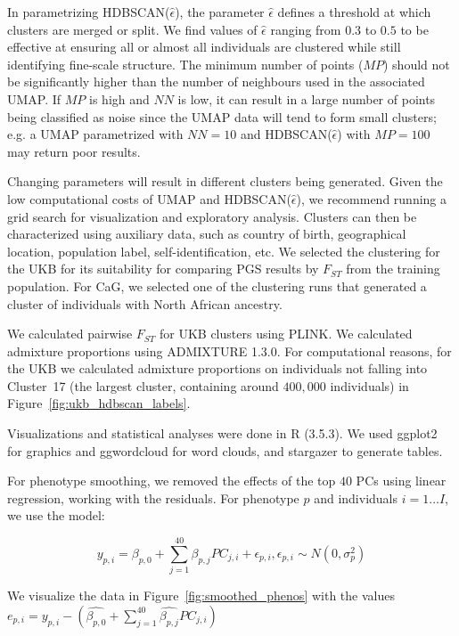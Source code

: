 In parametrizing HDBSCAN($\hat{\epsilon}$), the parameter $\hat{\epsilon}$ defines a threshold at which clusters are merged or split. We find values of $\hat{\epsilon}$ ranging from $0.3$ to $0.5$ to be effective at ensuring all or almost all individuals are clustered while still identifying fine-scale structure. The minimum number of points ($MP$) should not be significantly higher than the number of neighbours used in the associated UMAP. If $MP$ is high and $NN$ is low, it can result in a large number of points being classified as noise since the UMAP data will tend to form small clusters; e.g. a UMAP parametrized with $NN=10$ and HDBSCAN($\hat{\epsilon}$) with $MP=100$ may return poor results.

Changing parameters will result in different clusters being generated. Given the low computational costs of UMAP and HDBSCAN($\hat{\epsilon}$), we recommend running a grid search for visualization and exploratory analysis. Clusters can then be characterized using auxiliary data, such as country of birth, geographical location, population label, self-identification, etc. We selected the clustering for the UKB for its suitability for comparing PGS results by $F_{ST}$ from the training population. For CaG, we selected one of the clustering runs that generated a cluster of individuals with North African ancestry.

We calculated pairwise $F_{ST}$ for UKB clusters using PLINK\citep{purcell_plink_2007}. We calculated admixture proportions using ADMIXTURE 1.3.0\citep{alexander_fast_2009}. For computational reasons, for the UKB we calculated admixture proportions on individuals not falling into Cluster~17 (the largest cluster, containing around $400,000$ individuals) in Figure~\ref{fig:ukb_hdbscan_labels}.

Visualizations and statistical analyses were done in R (3.5.3)\citep{r_2018}. We used ggplot2\citep{wickham_2016} for graphics and ggwordcloud for word clouds, and stargazer\citep{Hlavac2018-fy} to generate tables.

For phenotype smoothing, we removed the effects of the top $40$ PCs using linear regression, working with the residuals. For phenotype $p$ and individuals $i=1 \dots I$, we use the model:

$$ y_{p,i} = \beta_{p,0} + \sum_{j=1}^{40}\beta_{p,j}PC_{j,i} + \epsilon_{p,i},  \epsilon_{p,i} \sim N(0,\sigma^2_{p}) $$

We visualize the data in Figure~\ref{fig:smoothed_phenos} with the values $ e_{p,i} = y_{p,i} - (\hat{\beta_{p,0}} + \sum_{j=1}^{40}\hat{\beta_{p,j}}PC_{j,i}) $



\clearpage

\makeatletter
\renewcommand\thetable{\@arabic\c@chapter s\@arabic\c@table}
\renewcommand \thefigure{\@arabic\c@chapter s\@arabic\c@figure}
\makeatother

\setcounter{figure}{0}  
\setcounter{table}{0}



\clearpage